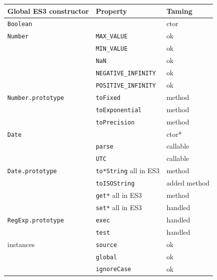 \documentclass[letterpaper,twocolumn,10pt]{article}
\newcommand{\code}[1]{{\tt {#1}}}              %
\begin{document}
\begin{figure}
\begin{tabular}{lll}
  Global ES3 constructor         & Property                    & Taming \\
  \hline 
  \code{Boolean}                 &                             & ctor \\
  \hline
  \code{Number}                  & \code{MAX\_VALUE}           & ok \\
                                 & \code{MIN\_VALUE}           & ok \\
                                 & \code{NaN}                  & ok \\
                                 & \code{NEGATIVE\_INFINITY}   & ok \\
                                 & \code{POSITIVE\_INFINITY}   & ok \\
  \code{Number.prototype}        & \code{toFixed}              & method \\
                                 & \code{toExponential}        & method \\
                                 & \code{toPrecision}          & method \\
  \hline
  \code{Date}                    &                             & ctor* \\
                                 & \code{parse}                & callable \\
                                 & \code{UTC}                  & callable \\
  \code{Date.prototype}          & \code{to*String} all in ES3 & method \\
                                 & \code{toISOString}          & added method \\
                                 & \code{get*}      all in ES3 & method \\
                                 & \code{set*}      all in ES3 & handled \\
  \hline
  \code{RegExp.prototype}        & \code{exec}                 & handled \\
                                 & \code{test}                 & handled \\
  instances                      & \code{source}               & ok \\
                                 & \code{global}               & ok \\
                                 & \code{ignoreCase}           & ok \\

\end{tabular}
\end{figure}
\end{document}

